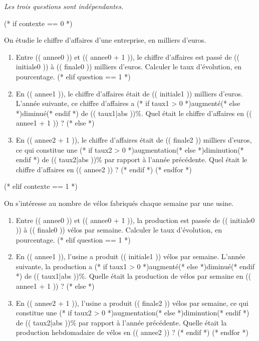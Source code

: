 \exercice
\emph{Les trois questions sont indépendantes.}

(* if contexte == 0 *)

    On étudie le chiffre d'affaires d'une entreprise, en milliers d'euros.

    \begin{enumerate}
      (* for question in ordre *)
        (* if question == 0 *)
          \item
            Entre (( annee0 )) et (( annee0 + 1 )),
            le chiffre d'affaires est passé de (( initiale0 )) à (( finale0 )) milliers d'euros.
            Calculer le taux d'évolution, en pourcentage.
        (* elif question == 1 *)
          \item
              En (( annee1 )), le chiffre d'affaires était de (( initiale1 )) milliers d'euros.
              L'année suivante, ce chiffre d'affaires a (* if taux1 > 0 *)augmenté(* else *)diminué(* endif *) de (( taux1|abs ))\%.
              Quel était le chiffre d'affaires en (( annee1 + 1 )) ?
        (* else *)
          \item
              En (( annee2 + 1 )), le chiffre d'affaires était de (( finale2 )) milliers d'euros,
              ce qui constitue une (* if taux2 > 0 *)augmentation(* else *)diminution(* endif *) de (( taux2|abs ))\% par rapport à l'année précédente.
              Quel était le chiffre d'affaires en (( annee2 )) ?
        (* endif *)
      (* endfor *)
    \end{enumerate}

(* elif contexte == 1 *)

    On s'intéresse au nombre de vélos fabriqués chaque semaine par une usine.

    \begin{enumerate}
      (* for question in ordre *)
        (* if question == 0 *)
          \item
            Entre (( annee0 )) et (( annee0 + 1 )),
            la production est passée de (( initiale0 )) à (( finale0 )) vélos par semaine.
            Calculer le taux d'évolution, en pourcentage.
        (* elif question == 1 *)
          \item
              En (( annee1 )), l'usine a produit (( initiale1 )) vélos par semaine.
              L'année suivante, la production a (* if taux1 > 0 *)augmenté(* else *)diminué(* endif *) de (( taux1|abs ))\%.
              Quelle était la production de vélos par semaine en (( annee1 + 1 )) ?
        (* else *)
          \item
              En (( annee2 + 1 )), l'usine a produit (( finale2 )) vélos par semaine,
              ce qui constitue une (* if taux2 > 0 *)augmentation(* else *)diminution(* endif *) de (( taux2|abs ))\% par rapport à l'année précédente.
            Quelle était la production hebdomadaire de vélos en (( annee2 )) ?
        (* endif *)
      (* endfor *)
    \end{enumerate}

